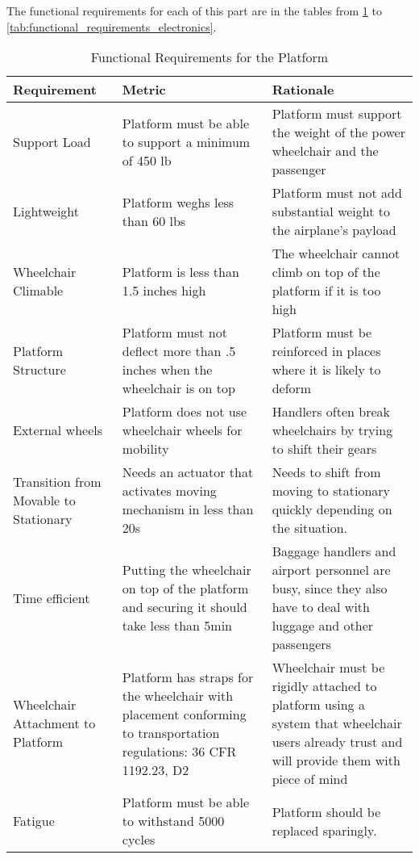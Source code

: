 The functional requirements for each of this part are in the tables from \ref{tab:functional_requirements_platform} to \ref{tab:functional_requirements_electronics}.

\newpage

\begin{table}
\begin{tabular} {| p{4cm} | p{5cm} | p{5cm} |}
\hline
\textbf{Requirement} & \textbf{Metric} & \textbf{Rationale} \\ \hline

Support Load & Platform must be able to support a minimum of 450 lb & Platform must support the weight of the power wheelchair and the passenger \\ \hline
Lightweight & Platform weghs less than 60 lbs & Platform must not add substantial weight to the airplane's payload \\ \hline
Wheelchair Climable & Platform is less than 1.5 inches high & The wheelchair cannot climb on top of the platform if it is too high  \\ \hline
Platform Structure & Platform must not deflect more than .5 inches when the wheelchair is on top & Platform must be reinforced in places where it is likely to deform \\ \hline
External wheels & Platform does not use wheelchair wheels for mobility & Handlers often break wheelchairs by trying to shift their gears \\ \hline
Transition from Movable to Stationary & Needs an actuator that activates moving mechanism in less than 20s & Needs to shift from moving to stationary quickly depending on the situation.  \\ \hline
Time efficient & Putting the wheelchair on top of the platform and securing it should take less than 5min & Baggage handlers and airport personnel are busy, since they also have to deal with luggage and other passengers \\ \hline
Wheelchair Attachment to Platform & Platform has straps for the wheelchair with placement conforming to transportation regulations: 36 CFR 1192.23, D2 
& Wheelchair must be rigidly attached to platform using a system that wheelchair users already trust and will provide them with piece of mind\\ \hline
Fatigue & Platform must be able to withstand 5000 cycles & Platform should be replaced sparingly. \\ \hline
\end{tabular} 
\caption{Functional Requirements for the Platform}
\label{tab:functional_requirements_platform}
\end{table}

